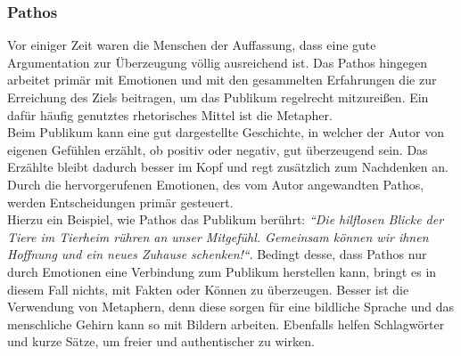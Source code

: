 \subsubsection{Pathos}
Vor einiger Zeit waren die Menschen der Auffassung, dass eine gute Argumentation zur Überzeugung völlig ausreichend ist. Das Pathos hingegen arbeitet primär mit Emotionen und mit den gesammelten  Erfahrungen die zur Erreichung des Ziels beitragen, um das Publikum regelrecht mitzureißen. Ein dafür häufig genutztes rhetorisches Mittel ist die Metapher. \\Beim Publikum kann eine gut dargestellte Geschichte, in welcher der Autor von eigenen Gefühlen erzählt, ob positiv oder negativ, gut überzeugend sein. Das Erzählte bleibt dadurch besser im Kopf und regt zusätzlich zum Nachdenken an. Durch die hervorgerufenen Emotionen, des vom Autor angewandten Pathos, werden Entscheidungen primär gesteuert. \\Hierzu ein Beispiel, wie Pathos das Publikum berührt: \textit{“Die hilflosen 
Blicke der Tiere im Tierheim rühren an unser Mitgefühl. Gemeinsam können wir ihnen Hoffnung und ein neues Zuhause schenken!“}. Bedingt desse, dass Pathos nur durch Emotionen eine Verbindung zum Publikum herstellen kann, bringt es in diesem Fall nichts, mit Fakten oder Können zu überzeugen. Besser ist die Verwendung von Metaphern, denn diese sorgen für eine bildliche Sprache und das menschliche Gehirn kann so mit Bildern arbeiten. Ebenfalls helfen Schlagwörter und kurze Sätze, um freier und authentischer zu wirken.

